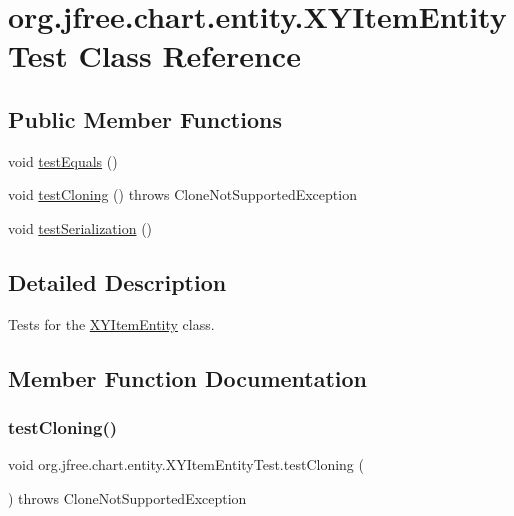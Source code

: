 \hypertarget{classorg_1_1jfree_1_1chart_1_1entity_1_1_x_y_item_entity_test}{}\section{org.\+jfree.\+chart.\+entity.\+X\+Y\+Item\+Entity\+Test Class Reference}
\label{classorg_1_1jfree_1_1chart_1_1entity_1_1_x_y_item_entity_test}
\subsection*{Public Member Functions}
\begin{DoxyCompactItemize}
\item 
void \mbox{\hyperlink{classorg_1_1jfree_1_1chart_1_1entity_1_1_x_y_item_entity_test_a57a4c5dfe99882cd3f3214bdb2b5839f}{test\+Equals}} ()
\item 
void \mbox{\hyperlink{classorg_1_1jfree_1_1chart_1_1entity_1_1_x_y_item_entity_test_a52dfa8030a43c3e912938e252cc2fad8}{test\+Cloning}} ()  throws Clone\+Not\+Supported\+Exception 
\item 
void \mbox{\hyperlink{classorg_1_1jfree_1_1chart_1_1entity_1_1_x_y_item_entity_test_ac2d2d611185a28f0dca2b21195e63c44}{test\+Serialization}} ()
\end{DoxyCompactItemize}


\subsection{Detailed Description}
Tests for the \mbox{\hyperlink{classorg_1_1jfree_1_1chart_1_1entity_1_1_x_y_item_entity}{X\+Y\+Item\+Entity}} class. 

\subsection{Member Function Documentation}
\mbox{\label{classorg_1_1jfree_1_1chart_1_1entity_1_1_x_y_item_entity_test_a52dfa8030a43c3e912938e252cc2fad8}} 
\subsubsection{\texorpdfstring{test\+Cloning()}{testCloning()}}
{\footnotesize\ttfamily void org.\+jfree.\+chart.\+entity.\+X\+Y\+Item\+Entity\+Test.\+test\+Cloning (\begin{DoxyParamCaption}{ }\end{DoxyParamCaption}) throws Clone\+Not\+Supported\+Exception}

